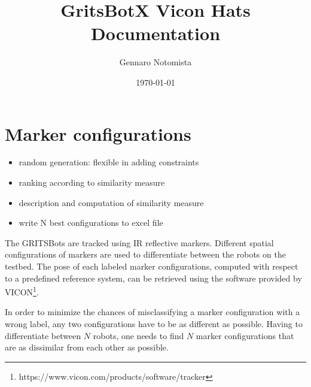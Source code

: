 \documentclass{article}
\title{GritsBotX Vicon Hats Documentation}
\author{Gennaro Notomista}
\date{\today}
\begin{document}
\maketitle

\section{Marker configurations}

\begin{itemize}
\item random generation: flexible in adding constraints
\item ranking according to similarity measure
\item description and computation of similarity measure
\item write N best configurations to excel file
\end{itemize}

The GRITSBots are tracked using IR reflective markers. Different spatial configurations of markers are used to differentiate between the robots on the testbed. The pose of each labeled marker configurations, computed with respect to a predefined reference system, can be retrieved using the software provided by VICON\footnote{https://www.vicon.com/products/software/tracker}.

In order to minimize the chances of misclassifying a marker configuration with a wrong label, any two configurations have to be as different as possible. Having to differentiate between $N$ robots, one needs to find $N$ marker configurations that are as dissimilar from each other as possible.
\end{document}
